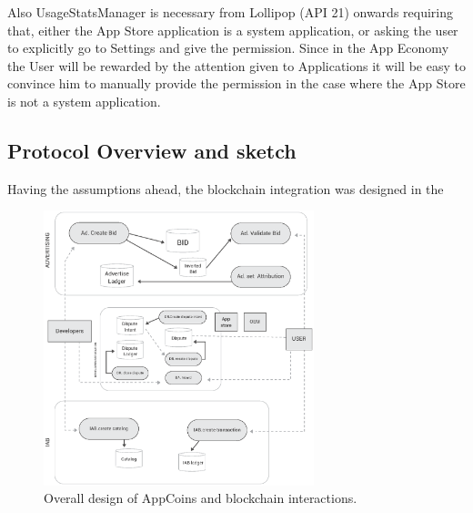 Also UsageStatsManager is necessary from Lollipop (API 21) onwards requiring that, either the App Store application is a system application, or asking the user to explicitly go to Settings and give the permission. Since in the App Economy the User will be rewarded by the attention given to Applications it will be easy to convince him to manually provide the permission in the case where the App Store is not a system application.


\subsection{Protocol Overview and sketch}


Having the assumptions ahead, the blockchain integration was designed in the 

\begin{figure}[!ht]
\centering
\includegraphics[width=0.7\textwidth]{diagrams/design.eps}
\caption{Overall design of AppCoins and blockchain interactions.}
\label{fig:design}
\end{figure}






%


